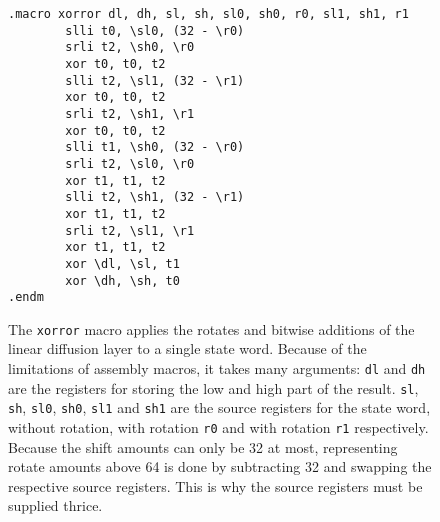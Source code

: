 \begin{figure}
\begin{verbatim}
.macro xorror dl, dh, sl, sh, sl0, sh0, r0, sl1, sh1, r1
        slli t0, \sl0, (32 - \r0)
        srli t2, \sh0, \r0
        xor t0, t0, t2
        slli t2, \sl1, (32 - \r1)
        xor t0, t0, t2
        srli t2, \sh1, \r1
        xor t0, t0, t2
        slli t1, \sh0, (32 - \r0)
        srli t2, \sl0, \r0
        xor t1, t1, t2
        slli t2, \sh1, (32 - \r1)
        xor t1, t1, t2
        srli t2, \sl1, \r1
        xor t1, t1, t2
        xor \dl, \sl, t1
        xor \dh, \sh, t0
.endm
\end{verbatim}

\caption{The \texttt{xorror} macro applies the rotates and bitwise additions of
the linear diffusion layer to a single state word. Because of the limitations of
assembly macros, it takes many arguments:
\texttt{dl} and \texttt{dh} are the registers for storing the low and high part
of the result. \texttt{sl}, \texttt{sh}, \texttt{sl0}, \texttt{sh0},
\texttt{sl1} and \texttt{sh1} are the source registers for the state word,
without rotation, with rotation \texttt{r0} and with rotation \texttt{r1}
respectively. Because the shift amounts can only be 32 at most, representing
rotate amounts above 64 is done by subtracting 32 and swapping the respective
source registers. This is why the source registers must be supplied thrice.}
\label{xorror}
\end{figure}
